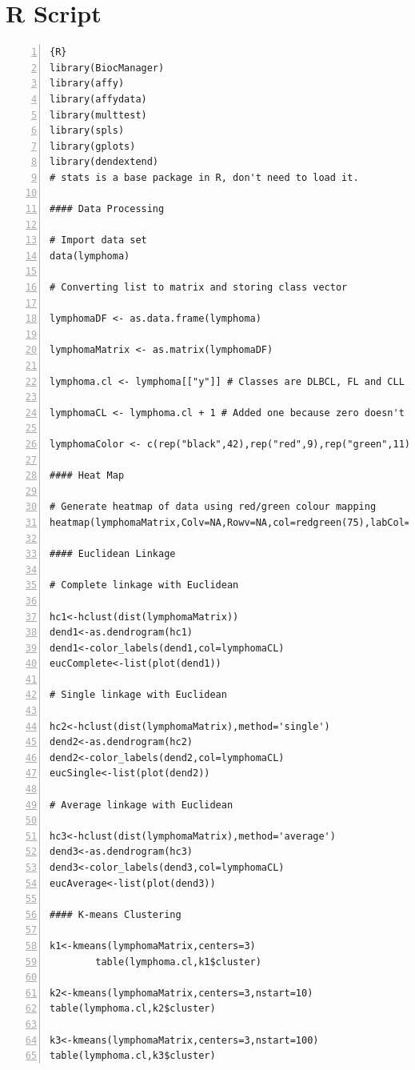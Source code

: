 \documentclass[11 pt,letterpaper,titlepage]{article} %
\begin{document}
\section{R Script}
\begin{lstlisting}[breaklines=T,numbers=left,numberstyle=\tiny]{R}
library(BiocManager)
library(affy)
library(affydata)
library(multtest)
library(spls)
library(gplots)
library(dendextend)
# stats is a base package in R, don't need to load it.

#### Data Processing

# Import data set
data(lymphoma)

# Converting list to matrix and storing class vector

lymphomaDF <- as.data.frame(lymphoma)

lymphomaMatrix <- as.matrix(lymphomaDF)

lymphoma.cl <- lymphoma[["y"]] # Classes are DLBCL, FL and CLL lymphocyte malignancies

lymphomaCL <- lymphoma.cl + 1 # Added one because zero doesn't represent a colour

lymphomaColor <- c(rep("black",42),rep("red",9),rep("green",11))

#### Heat Map

# Generate heatmap of data using red/green colour mapping
heatmap(lymphomaMatrix,Colv=NA,Rowv=NA,col=redgreen(75),labCol="",RowSideColors=lymphomaColor)

#### Euclidean Linkage

# Complete linkage with Euclidean

hc1<-hclust(dist(lymphomaMatrix))
dend1<-as.dendrogram(hc1)
dend1<-color_labels(dend1,col=lymphomaCL)
eucComplete<-list(plot(dend1))

# Single linkage with Euclidean

hc2<-hclust(dist(lymphomaMatrix),method='single')
dend2<-as.dendrogram(hc2)
dend2<-color_labels(dend2,col=lymphomaCL)
eucSingle<-list(plot(dend2))

# Average linkage with Euclidean

hc3<-hclust(dist(lymphomaMatrix),method='average')
dend3<-as.dendrogram(hc3)
dend3<-color_labels(dend3,col=lymphomaCL)
eucAverage<-list(plot(dend3))

#### K-means Clustering

k1<-kmeans(lymphomaMatrix,centers=3)
        table(lymphoma.cl,k1$cluster)

k2<-kmeans(lymphomaMatrix,centers=3,nstart=10)
table(lymphoma.cl,k2$cluster)

k3<-kmeans(lymphomaMatrix,centers=3,nstart=100)
table(lymphoma.cl,k3$cluster)
\end{lstlisting}
\end{document}
